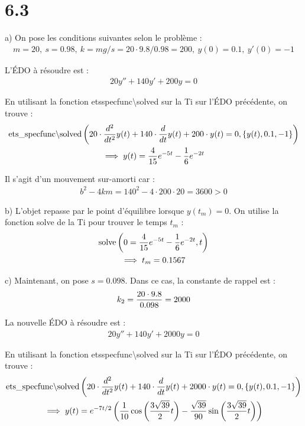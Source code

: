 \section*{6.3}

a) On pose les conditions suivantes selon le problème :
\begin{align*}
    m = 20,\ s = 0.98,\ k = mg/s = 20\cdot9.8 / 0.98 = 200,\ y(0)=0.1,\ y'(0)=-1
\end{align*}

L'ÉDO à résoudre est :
\begin{align*}
    20y'' + 140y'+200y=0
\end{align*}

En utilisant la fonction ets\textunderscore specfunc\textbackslash solved sur la Ti
sur l'ÉDO précédente, on trouve :
\begin{gather*}
    \operatorname{ets\_ specfunc\backslash solved} \left({20\cdot\dfrac{d ^2}{d t^2}y(t) + 140\cdot \dfrac{d }{d t}y(t)
    +200\cdot y(t)=0,\{y(t),0.1,-1\}}\right) \\
    \implies y(t) = \dfrac{4}{15}e^{-5t}-\dfrac{1}{6}e^{-2t}
\end{gather*}

Il s'agit d'un mouvement sur-amorti car :
\begin{align*}
    b^2 -4km = 140^2-4\cdot200\cdot20 = 3600 > 0
\end{align*}

b) L'objet repasse par le point d'équilibre lorsque $y(t_m) = 0$. On utilise la
fonction solve de la Ti pour trouver le temps $t_m$ :
\begin{gather*}
    \operatorname{solve}\left({0=\dfrac{4}{15}e^{-5t}-\dfrac{1}{6}e^{-2t},t}\right) \\
    \implies t_m = 0.1567
\end{gather*}

c) Maintenant, on pose $s = 0.098$. Dans ce cas, la constante de rappel est :
\begin{align*}
    k_2 = \dfrac{20\cdot9.8}{0.098}=2000
\end{align*}

La nouvelle ÉDO à résoudre est :
\begin{align*}
    20y'' + 140y'+2000y=0
\end{align*}

En utilisant la fonction ets\textunderscore specfunc\textbackslash solved sur la Ti
sur l'ÉDO précédente, on trouve :
\begin{gather*}
    \operatorname{ets\_ specfunc\backslash solved} \left({20\cdot\dfrac{d ^2}{d t^2}y(t) + 140\cdot \dfrac{d }{d t}y(t)
    +2000\cdot y(t)=0,\{y(t),0.1,-1\}}\right) \\
    \implies y(t) = e^{-7t/2}\left({\dfrac{1}{10}\cos \left({\dfrac{3\sqrt{39}}{2}t}\right)
    -\dfrac{\sqrt{39}}{90}\sin \left({\dfrac{3\sqrt{39}}{2}t}\right)}\right)
\end{gather*}


